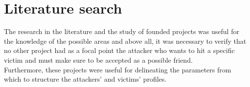 

\chapter{Literature search}
\label{cap:introduzione}
The research in the literature and the study of founded projects was useful for the knowledge of the possible areas and above all, it was necessary to verify that no other project had as a focal point the attacker who wants to hit a specific victim and must make sure to be accepted as a possible friend. \\
Furthermore, these projects were useful for delineating the parameters from which to structure the attackers' and victims' profiles.
